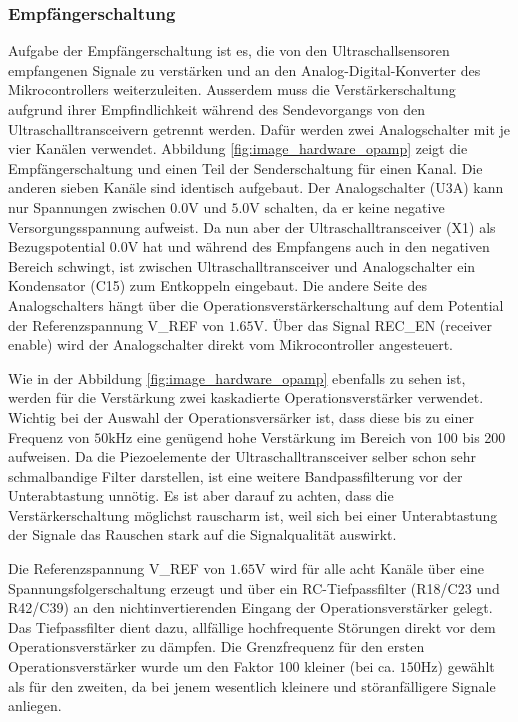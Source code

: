 \subsubsection{Empfängerschaltung}\label{sec:empfaengerschaltung}
Aufgabe der Empfängerschaltung ist es, die von den Ultraschallsensoren empfangenen Signale zu verstärken und an den Analog-Digital-Konverter des Mikrocontrollers weiterzuleiten. Ausserdem muss die Verstärkerschaltung aufgrund ihrer Empfindlichkeit während des Sendevorgangs von den Ultraschalltransceivern getrennt werden. Dafür werden zwei Analogschalter mit je vier Kanälen verwendet. Abbildung \ref{fig:image_hardware_opamp} zeigt die Empfängerschaltung und einen Teil der Senderschaltung für einen Kanal. Die anderen sieben Kanäle sind identisch aufgebaut. Der Analogschalter (U3A) kann nur Spannungen zwischen $0.0 \mathrm{V}$ und $5.0 \mathrm{V}$ schalten, da er keine negative Versorgungsspannung aufweist. Da nun aber der Ultraschalltransceiver (X1) als Bezugspotential $0.0 \mathrm{V}$ hat und während des Empfangens auch in den negativen Bereich schwingt, ist zwischen Ultraschalltransceiver und Analogschalter ein Kondensator (C15) zum Entkoppeln eingebaut. Die andere Seite des Analogschalters hängt über die Operationsverstärkerschaltung auf dem Potential der Referenzspannung V\_REF von $1.65 \mathrm{V}$. Über das Signal REC\_EN (receiver enable) wird der Analogschalter direkt vom Mikrocontroller angesteuert.

Wie in der Abbildung \ref{fig:image_hardware_opamp} ebenfalls zu sehen ist, werden für die Verstärkung zwei kaskadierte Operationsverstärker verwendet. Wichtig bei der Auswahl der Operationsversärker ist, dass diese bis zu einer Frequenz von $50 \mathrm{kHz}$ eine genügend hohe Verstärkung im Bereich von 100 bis 200 aufweisen. Da die Piezoelemente der Ultraschalltransceiver selber schon sehr schmalbandige Filter darstellen, ist eine weitere Bandpassfilterung vor der Unterabtastung unnötig. Es ist aber darauf zu achten, dass die Verstärkerschaltung möglichst rauscharm ist, weil sich bei einer Unterabtastung der Signale das Rauschen stark auf die Signalqualität auswirkt.

Die Referenzspannung V\_REF von $1.65 \mathrm{V}$ wird für alle acht Kanäle über eine Spannungsfolgerschaltung erzeugt und über ein RC-Tiefpassfilter (R18/C23 und R42/C39) an den nichtinvertierenden Eingang der Operationsverstärker gelegt. Das Tiefpassfilter dient dazu, allfällige hochfrequente Störungen direkt vor dem Operationsverstärker zu dämpfen. Die Grenzfrequenz für den ersten Operationsverstärker wurde um den Faktor 100 kleiner (bei ca. $150 \mathrm{Hz}$) gewählt als für den zweiten, da bei jenem wesentlich kleinere und störanfälligere Signale anliegen.

